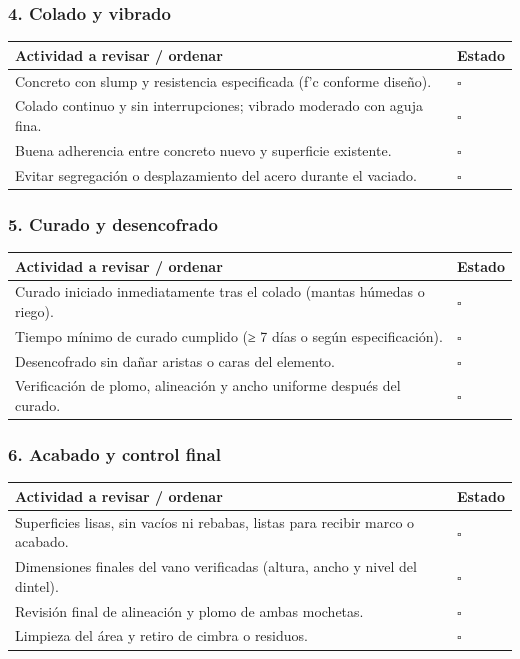 \documentclass[12pt]{article}
\newcommand{\cbox}{\(\square\)}
\renewcommand{\cbox}{\(\square\)} %
\begin{document}
	\subsubsection*{4. Colado y vibrado}
	\begin{tabularx}{\linewidth}{>{\raggedright\arraybackslash}p{0.93\linewidth} >{\centering\arraybackslash}m{0.07\linewidth}}
		\toprule
		\textbf{Actividad a revisar / ordenar} & \textbf{Estado}\\
		\midrule
		Concreto con slump y resistencia especificada (f’c conforme diseño). & \cbox \\
		Colado continuo y sin interrupciones; vibrado moderado con aguja fina. & \cbox \\
		Buena adherencia entre concreto nuevo y superficie existente. & \cbox \\
		Evitar segregación o desplazamiento del acero durante el vaciado. & \cbox \\
		\bottomrule
	\end{tabularx}
	
	\subsubsection*{5. Curado y desencofrado}
	\begin{tabularx}{\linewidth}{>{\raggedright\arraybackslash}p{0.93\linewidth} >{\centering\arraybackslash}m{0.07\linewidth}}
		\toprule
		\textbf{Actividad a revisar / ordenar} & \textbf{Estado}\\
		\midrule
		Curado iniciado inmediatamente tras el colado (mantas húmedas o riego). & \cbox \\
		Tiempo mínimo de curado cumplido (≥ 7 días o según especificación). & \cbox \\
		Desencofrado sin dañar aristas o caras del elemento. & \cbox \\
		Verificación de plomo, alineación y ancho uniforme después del curado. & \cbox \\
		\bottomrule
	\end{tabularx}
	
	\subsubsection*{6. Acabado y control final}
	\begin{tabularx}{\linewidth}{>{\raggedright\arraybackslash}p{0.93\linewidth} >{\centering\arraybackslash}m{0.07\linewidth}}
		\toprule
		\textbf{Actividad a revisar / ordenar} & \textbf{Estado}\\
		\midrule
		Superficies lisas, sin vacíos ni rebabas, listas para recibir marco o acabado. & \cbox \\
		Dimensiones finales del vano verificadas (altura, ancho y nivel del dintel). & \cbox \\
		Revisión final de alineación y plomo de ambas mochetas. & \cbox \\
		Limpieza del área y retiro de cimbra o residuos. & \cbox \\
		\bottomrule
	\end{tabularx}
	
\end{document}
